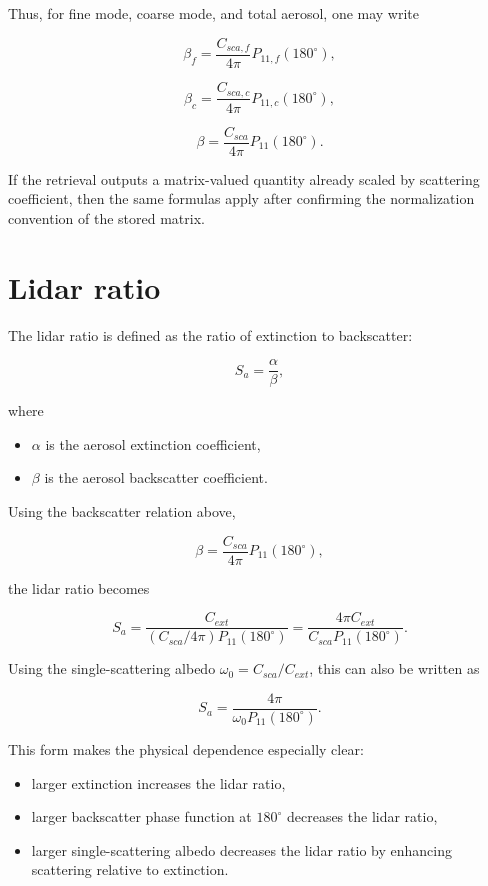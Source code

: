 \documentclass[
  letterpaper,
]{scrbook}
\providecommand{\tightlist}{%
  \setlength{\itemsep}{0pt}\setlength{\parskip}{0pt}}
\begin{document}
Thus, for fine mode, coarse mode, and total aerosol, one may write

\[
\beta_f = \frac{C_{sca,f}}{4\pi} P_{11,f}(180^\circ),
\]

\[
\beta_c = \frac{C_{sca,c}}{4\pi} P_{11,c}(180^\circ),
\]

\[
\beta = \frac{C_{sca}}{4\pi} P_{11}(180^\circ).
\]

If the retrieval outputs a matrix-valued quantity already scaled by
scattering coefficient, then the same formulas apply after confirming
the normalization convention of the stored matrix.

\section{Lidar ratio}\label{lidar-ratio}

The lidar ratio is defined as the ratio of extinction to backscatter:

\[
S_a = \frac{\alpha}{\beta},
\]

where

\begin{itemize}
\tightlist
\item
  \(\alpha\) is the aerosol extinction coefficient,
\item
  \(\beta\) is the aerosol backscatter coefficient.
\end{itemize}

Using the backscatter relation above,

\[
\beta = \frac{C_{sca}}{4\pi} P_{11}(180^\circ),
\]

the lidar ratio becomes

\[
S_a
= \frac{C_{ext}}{ \left(C_{sca}/4\pi\right) P_{11}(180^\circ)}
= \frac{4\pi C_{ext}}{C_{sca} P_{11}(180^\circ)}.
\]

Using the single-scattering albedo \(\omega_0=C_{sca}/C_{ext}\), this
can also be written as

\[
S_a = \frac{4\pi}{\omega_0 P_{11}(180^\circ)}.
\]

This form makes the physical dependence especially clear:

\begin{itemize}
\tightlist
\item
  larger extinction increases the lidar ratio,
\item
  larger backscatter phase function at \(180^\circ\) decreases the lidar
  ratio,
\item
  larger single-scattering albedo decreases the lidar ratio by enhancing
  scattering relative to extinction.
\end{itemize}
\end{document}
